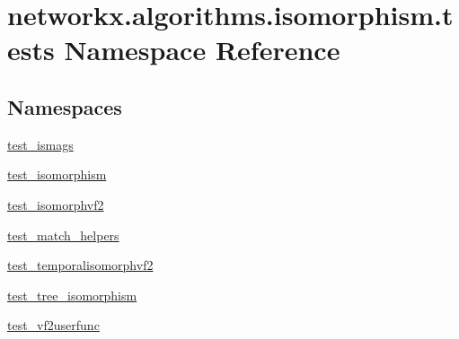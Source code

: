 \hypertarget{namespacenetworkx_1_1algorithms_1_1isomorphism_1_1tests}{}\section{networkx.\+algorithms.\+isomorphism.\+tests Namespace Reference}
\label{namespacenetworkx_1_1algorithms_1_1isomorphism_1_1tests}
\subsection*{Namespaces}
\begin{DoxyCompactItemize}
\item 
 \hyperlink{namespacenetworkx_1_1algorithms_1_1isomorphism_1_1tests_1_1test__ismags}{test\+\_\+ismags}
\item 
 \hyperlink{namespacenetworkx_1_1algorithms_1_1isomorphism_1_1tests_1_1test__isomorphism}{test\+\_\+isomorphism}
\item 
 \hyperlink{namespacenetworkx_1_1algorithms_1_1isomorphism_1_1tests_1_1test__isomorphvf2}{test\+\_\+isomorphvf2}
\item 
 \hyperlink{namespacenetworkx_1_1algorithms_1_1isomorphism_1_1tests_1_1test__match__helpers}{test\+\_\+match\+\_\+helpers}
\item 
 \hyperlink{namespacenetworkx_1_1algorithms_1_1isomorphism_1_1tests_1_1test__temporalisomorphvf2}{test\+\_\+temporalisomorphvf2}
\item 
 \hyperlink{namespacenetworkx_1_1algorithms_1_1isomorphism_1_1tests_1_1test__tree__isomorphism}{test\+\_\+tree\+\_\+isomorphism}
\item 
 \hyperlink{namespacenetworkx_1_1algorithms_1_1isomorphism_1_1tests_1_1test__vf2userfunc}{test\+\_\+vf2userfunc}
\end{DoxyCompactItemize}
